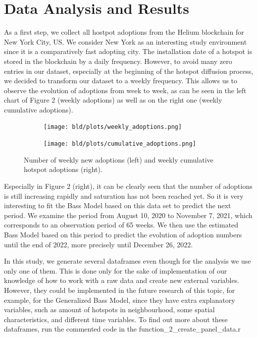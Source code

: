 \documentclass{article}
\begin{document}
\clearpage


\section{Data Analysis and Results}

As a first step, we collect all hostpot adoptions from the Helium blockchain for New York City, US. We consider New York as an interesting study
environment since it is a comparatively fast adopting city. The installation date of a hotspot is stored in the blockchain by a daily frequency. However, to
avoid many zero entries in our dataset, especially at the beginning of the hotspot diffusion process, we decided to transform our dataset to a weekly frequency.
This allows us to observe the evolution of adoptions from week to week, as can be seen in the left chart of Figure 2 (weekly adoptions) as well as on the right
one (weekly cumulative adoptions).

\begin{figure}[!hptb]
    \begin{subfigure}[h]{0.52\linewidth}
    \texttt{[image: bld/plots/weekly\_adoptions.png]}
    \end{subfigure}
    \hfill
    \begin{subfigure}[h]{0.52\linewidth}
    \texttt{[image: bld/plots/cumulative\_adoptions.png]}
    \end{subfigure}%
    \caption{Number of weekly new adoptions (left) and weekly cumulative hotspot adoptions (right).}
    \end{figure}


\noindent Especially in Figure 2 (right), it can be clearly seen that the number of adoptions is still increasing rapidly and saturation has not been reached yet.
So it is very interesting to fit the Bass Model based on this data set to predict the next period. We examine the period from August 10, 2020 to November 7, 2021,
which corresponds to an observation period of 65 weeks. We then use the estimated Bass Model based on this period to predict the evolution of adoption numbers until
the end of 2022, more precisely until December 26, 2022.

In this study, we generate several dataframes even though for the analysis we use only one of them. 
This is done only for the sake of implementation of our knowledge of how to work with a raw data and create new external variables.
However, they could be implemented in the future research of this topic, for example, for the Generalized Bass Model, since they
have extra explanatory variables, such as amount of hotspots in neighbourhood, some spatial characteristics, and different time variables. To find out more about these dataframes, run the commented code in the function_2_create_panel_data.r
\end{document}

